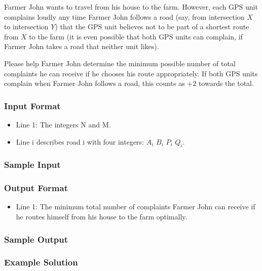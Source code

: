 Farmer John wants to travel from his house to the farm.  
However, each GPS unit complains loudly any time Farmer John follows a road (say, from intersection $X$ to intersection $Y$) that the GPS unit believes 
not to be part of a shortest route from $X$ to the farm (it is even possible that both GPS units can complain, 
if Farmer John takes a road that neither unit likes). 

Please help Farmer John determine the minimum possible number of total complaints he can receive if he chooses his route appropriately.  
If both GPS units complain when Farmer John follows a road, this counts as $+2$ towards the total.

\subsubsection{Input Format}
\begin{itemize}
	\item Line 1: The integers N and M. 
	\item Line i describes road i with four integers: $A_i$ $B_i$ $P_i$ $Q_i$. 
\end{itemize}

\subsubsection{Sample Input}

\subsubsection{Output Format}
\begin{itemize}
	\item Line 1: The minimum total number of complaints Farmer John can receive if he
        			routes himself from his house to the farm optimally.
\end{itemize}

\subsubsection{Sample Output}

\subsubsection{Example Solution}


